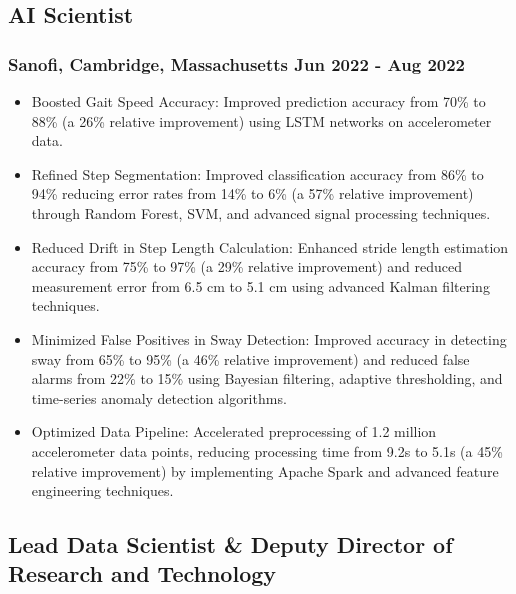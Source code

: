 \documentclass[11pt]{article}
\begin{document}
\subsection{AI Scientist}
\subsubsection{Sanofi, Cambridge, Massachusetts \hfill Jun 2022 - Aug 2022}
\begin{itemize}[itemsep=5pt]
	\item Boosted Gait Speed Accuracy: Improved prediction accuracy from 70\% to 88\% (a 26\% relative improvement) using LSTM networks on accelerometer data.
	\item Refined Step Segmentation: Improved classification accuracy from 86\% to 94\% reducing error rates from 14\% to 6\% (a 57\% relative improvement) through Random Forest, SVM, and advanced signal processing techniques.
	\item Reduced Drift in Step Length Calculation: Enhanced stride length estimation accuracy from 75\% to 97\% (a 29\% relative improvement) and reduced measurement error from 6.5 cm to 5.1 cm using advanced Kalman filtering techniques.
	\item Minimized False Positives in Sway Detection: Improved accuracy in detecting sway from 65\% to 95\% (a 46\% relative improvement) and reduced false alarms from 22\% to 15\% using Bayesian filtering, adaptive thresholding, and time-series anomaly detection algorithms.
	\item Optimized Data Pipeline: Accelerated preprocessing of 1.2 million accelerometer data points, reducing processing time from 9.2s to 5.1s (a 45\% relative improvement) by implementing Apache Spark and advanced feature engineering techniques.
\end{itemize}

\subsection{Lead Data Scientist \& Deputy Director of Research and Technology}
\end{document}
